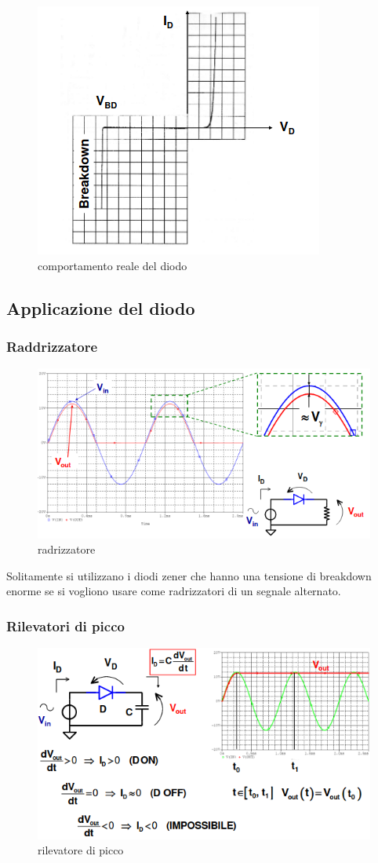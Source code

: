 \begin{figure}[H]
    \centering
    \includegraphics[width=0.3\linewidth]{imgs/breakdown}
    \caption{comportamento reale del diodo}
    \label{fig:breakdown}
\end{figure}

\subsection{Applicazione del diodo}
\subsubsection{Raddrizzatore}
\begin{figure}[H]
    \centering
    \includegraphics[width=0.7\linewidth]{imgs/radrizzatore}
    \caption{radrizzatore}
    \label{fig:radrizzatore}

\end{figure}
Solitamente si utilizzano i diodi zener che hanno una tensione di breakdown enorme se si vogliono usare come
radrizzatori di un segnale alternato.

\subsubsection{Rilevatori di picco}
\begin{figure}[H]
    \centering
    \includegraphics[width=0.8\linewidth]{imgs/rilevatore-di-picco}
    \caption{rilevatore di picco}
    \label{fig:rilevatore-di-picco}
\end{figure}

